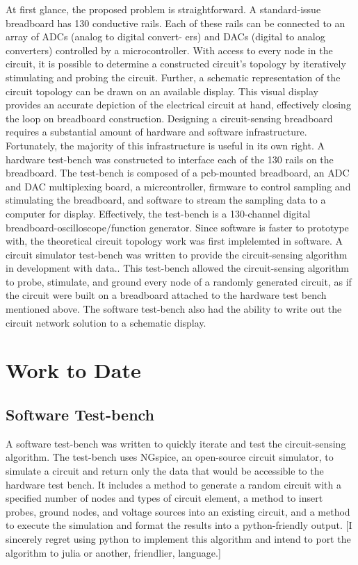 \documentclass[11pt, a4paper]{article}
\begin{document}
At first glance, the proposed problem is straightforward. 
A standard-issue breadboard has 130 conductive rails. 
Each of these rails can be connected to an array of ADCs (analog to digital convert-
ers) and DACs (digital to analog converters) controlled by a microcontroller. 
With access to every node in the circuit, it is possible to determine a constructed circuit's topology by iteratively stimulating and probing the circuit. 
Further, a schematic representation of the circuit topology can be drawn on an available display.
This visual display provides an accurate depiction of the electrical circuit at hand, effectively closing the loop on breadboard construction.
Designing a circuit-sensing breadboard requires a substantial amount of hardware and software infrastructure. 
Fortunately, the majority of this infrastructure is useful in its own right. 
A hardware test-bench was constructed to interface each of the 130 rails on the breadboard. 
The test-bench is composed of a pcb-mounted breadboard, an ADC and DAC multiplexing board, a micrcontroller, firmware to control sampling and stimulating the breadboard, and software to stream the sampling data to a computer for display.
Effectively, the test-bench is a 130-channel digital breadboard-oscilloscope/function generator. 
Since software is faster to prototype with, the theoretical circuit topology work was first implelemted in software. 
A circuit simulator test-bench was written to provide the circuit-sensing algorithm in development with data.. 
This test-bench allowed the circuit-sensing algorithm to probe, stimulate, and ground every node of a randomly generated circuit, as if the circuit were built on a breadboard attached to the hardware test bench mentioned above.
The software test-bench also had the ability to write out the circuit network solution to a schematic display.

\section{Work to Date}
\subsection{Software Test-bench}

A software test-bench was written to quickly iterate and test the circuit-sensing algorithm.
The test-bench uses NGspice, an open-source circuit simulator, to simulate a circuit and return only the data that would be accessible to the hardware test bench.
It includes a method to generate a random circuit with a specified number of nodes and types of circuit element, a method to insert probes, ground nodes, and voltage sources into an existing circuit, and a method to execute the simulation and format the results into a python-friendly output.
[I sincerely regret using python to implement this algorithm and intend to port the algorithm to julia or another, friendlier, language.]
\end{document}
